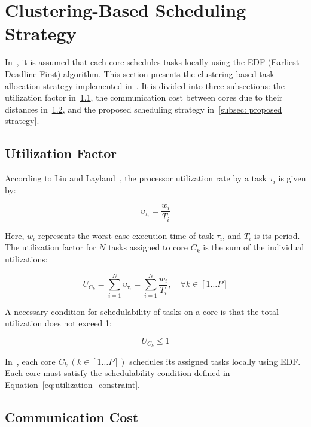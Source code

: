 \documentclass[conference]{IEEEtran}
\begin{document}
\section{Clustering-Based Scheduling Strategy}
\label{sec: clustering-based scheduling}

In~\cite{AbdallahGB24}, it is assumed that each core schedules tasks locally using the EDF (Earliest Deadline First) algorithm. This section presents the clustering-based task allocation strategy implemented in~\cite{AbdallahGB24}. It is divided into three subsections: the utilization factor in~\ref{subsec: utlization factor}, the communication cost between cores due to their distances in~\ref{communication cost}, and the proposed scheduling strategy in~\ref{subsec: proposed strategy}.

\subsection{Utilization Factor}
\label{subsec: utlization factor}

According to Liu and Layland~\cite{Fisher2016}, the processor utilization rate by a task $\tau_i$ is given by:

\begin{equation}
    \upsilon_{\tau_i} = \frac{w_i}{T_i}
   \label{eq:ut}
\end{equation}

Here, $w_i$ represents the worst-case execution time of task $\tau_i$, and $T_i$ is its period. The utilization factor for $N$ tasks assigned to core $C_k$ is the sum of the individual utilizations:

\begin{equation}
   U_{C_k} = \sum_{i=1}^{N} \upsilon_{\tau_i} = \sum_{i=1}^{N} \frac{w_i}{T_i}, \quad \forall k \in [1 \ldots P]
   \label{eq:utN}
\end{equation}

A necessary condition for schedulability of tasks on a core is that the total utilization does not exceed 1:

\begin{equation}
U_{C_k} \leq 1
\label{eq:utilization_constraint}
\end{equation}

In~\cite{AbdallahGB24}, each core $C_k \ (k \in [1 \ldots P])$ schedules its assigned tasks locally using EDF. Each core must satisfy the schedulability condition defined in Equation~\ref{eq:utilization_constraint}.

\subsection{Communication Cost}
\label{communication cost}
\end{document}
